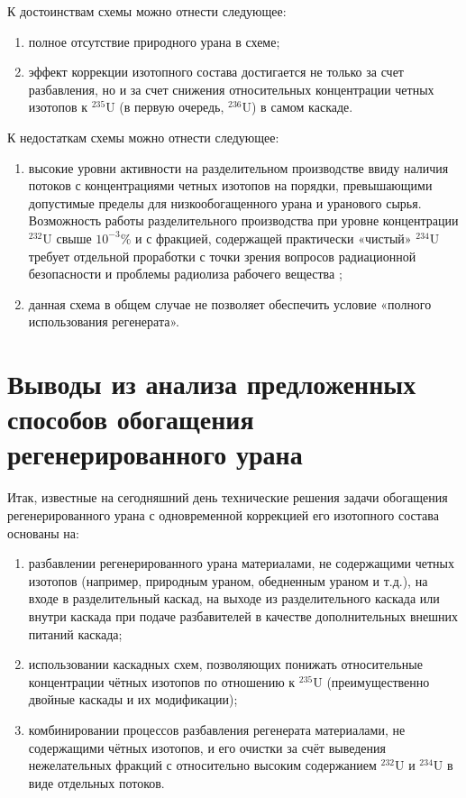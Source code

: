 К достоинствам схемы можно отнести следующее:

\begin{enumerate}
  \item полное отсутствие природного урана в схеме;
  \item эффект коррекции изотопного состава достигается не только за счет разбавления, но и за счет снижения относительных концентрации четных изотопов к $^{235}$U (в первую очередь, $^{236}$U) в самом каскаде.
\end{enumerate}

К недостаткам схемы можно отнести следующее:
\begin{enumerate}
  \item высокие уровни активности на разделительном производстве ввиду наличия потоков с концентрациями четных изотопов на порядки, превышающими допустимые пределы для низкообогащенного урана и уранового сырья. Возможность работы разделительного производства при уровне концентрации $^{232}$U свыше $10^{-3} \%$ и с фракцией, содержащей практически «чистый» $^{234}$U требует отдельной проработки с точки зрения вопросов радиационной безопасности и проблемы радиолиза рабочего вещества \cite{belovRADIOLIZOBOGAShchENNOGO2322019}; 
  \item данная схема в общем случае не позволяет обеспечить условие «полного использования регенерата».
\end{enumerate}


\section{Выводы из анализа предложенных способов обогащения регенерированного урана}

Итак, известные на сегодняшний день технические решения задачи обогащения регенерированного урана с одновременной коррекцией его изотопного состава основаны на:
\begin{enumerate}
  \item разбавлении регенерированного урана материалами, не содержащими четных изотопов (например, природным ураном, обедненным ураном и т.д.), на входе в разделительный каскад, на выходе из разделительного каскада или внутри каскада при подаче разбавителей в качестве дополнительных внешних питаний каскада;
  \item использовании каскадных схем, позволяющих понижать относительные концентрации чётных изотопов по отношению к $^{235}$U (преимущественно двойные каскады и их модификации);
  \item комбинировании процессов разбавления регенерата материалами, не содержащими чётных изотопов, и его очистки за счёт выведения нежелательных фракций с относительно высоким содержанием $^{232}$U и $^{234}$U в виде отдельных потоков.
\end{enumerate}

